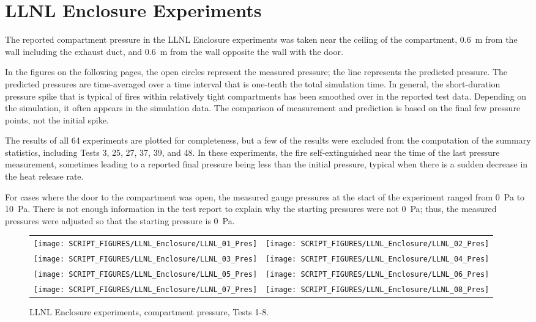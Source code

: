 \clearpage

\section{LLNL Enclosure Experiments}

The reported compartment pressure in the LLNL Enclosure experiments was taken near the ceiling of the compartment, 0.6~m from the wall including the exhaust duct, and 0.6~m from the wall opposite the wall with the door.

In the figures on the following pages, the open circles represent the measured pressure; the line represents the predicted pressure. The predicted pressures are time-averaged over a time interval that is one-tenth the total simulation time. In general, the short-duration pressure spike that is typical of fires within relatively tight compartments has been smoothed over in the reported test data. Depending on the simulation, it often appears in the simulation data. The comparison of measurement and prediction is based on the final few pressure points, not the initial spike.

The results of all 64 experiments are plotted for completeness, but a few of the results were excluded from the computation of the summary statistics, including Tests 3, 25, 27, 37, 39, and 48. In these experiments, the fire self-extinguished near the time of the last pressure measurement, sometimes leading to a reported final pressure being less than the initial pressure, typical when there is a sudden decrease in the heat release rate. 

For cases where the door to the compartment was open, the measured gauge pressures at the start of the experiment ranged from 0~Pa to 10~Pa. There is not enough information in the test report to explain why the starting pressures were not 0~Pa; thus, the measured pressures were adjusted so that the starting pressure is 0~Pa.

\begin{figure}[p]
\begin{tabular*}{\textwidth}{l@{\extracolsep{\fill}}r}
\texttt{[image: SCRIPT\_FIGURES/LLNL\_Enclosure/LLNL\_01\_Pres]} &
\texttt{[image: SCRIPT\_FIGURES/LLNL\_Enclosure/LLNL\_02\_Pres]} \\
\texttt{[image: SCRIPT\_FIGURES/LLNL\_Enclosure/LLNL\_03\_Pres]} &
\texttt{[image: SCRIPT\_FIGURES/LLNL\_Enclosure/LLNL\_04\_Pres]} \\
\texttt{[image: SCRIPT\_FIGURES/LLNL\_Enclosure/LLNL\_05\_Pres]} &
\texttt{[image: SCRIPT\_FIGURES/LLNL\_Enclosure/LLNL\_06\_Pres]} \\
\texttt{[image: SCRIPT\_FIGURES/LLNL\_Enclosure/LLNL\_07\_Pres]} &
\texttt{[image: SCRIPT\_FIGURES/LLNL\_Enclosure/LLNL\_08\_Pres]}
\end{tabular*}
\caption{LLNL Enclosure experiments, compartment pressure, Tests 1-8.}
\label{LLNL_Enclosure_Pres_1}
\end{figure}

